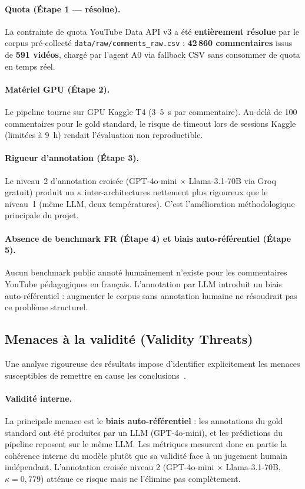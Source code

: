 \documentclass[12pt, a4paper]{article}
\begin{document}
\paragraph{Quota (Étape 1 — résolue).}
La contrainte de quota YouTube Data API v3 a été \textbf{entièrement résolue}
par le corpus pré-collecté \texttt{data/raw/comments\_raw.csv} :
\textbf{42\,860 commentaires} issus de \textbf{591 vidéos}, chargé par l'agent A0
via fallback CSV sans consommer de quota en temps réel.

\paragraph{Matériel GPU (Étape 2).}
Le pipeline tourne sur GPU Kaggle T4 (3--5~s par commentaire).
Au-delà de 100 commentaires pour le gold standard, le risque de timeout
lors de sessions Kaggle (limitées à 9~h) rendait l'évaluation non reproductible.

\paragraph{Rigueur d'annotation (Étape 3).}
Le niveau~2 d'annotation croisée (GPT-4o-mini $\times$ Llama-3.1-70B via Groq gratuit)
produit un $\kappa$ inter-architectures nettement plus rigoureux que le niveau~1
(même LLM, deux températures). C'est l'amélioration méthodologique principale du projet.

\paragraph{Absence de benchmark FR (Étape 4) et biais auto-référentiel (Étape 5).}
Aucun benchmark public annoté humainement n'existe pour les commentaires YouTube
pédagogiques en français. L'annotation par LLM introduit un biais auto-référentiel :
augmenter le corpus sans annotation humaine ne résoudrait pas ce problème structurel.

\subsection{Menaces à la validité (Validity Threats)}

Une analyse rigoureuse des résultats impose d'identifier explicitement les
menaces susceptibles de remettre en cause les conclusions~\cite{brown2020gpt3}.

\paragraph{Validité interne.}
La principale menace est le \textbf{biais auto-référentiel} : les annotations du
gold standard ont été produites par un LLM (GPT-4o-mini), et les prédictions du
pipeline reposent sur le même LLM. Les métriques mesurent donc en partie la
cohérence interne du modèle plutôt que sa validité face à un jugement humain
indépendant. L'annotation croisée niveau 2 (GPT-4o-mini $\times$ Llama-3.1-70B,
$\kappa = 0{,}779$) atténue ce risque mais ne l'élimine pas complètement.
\end{document}
